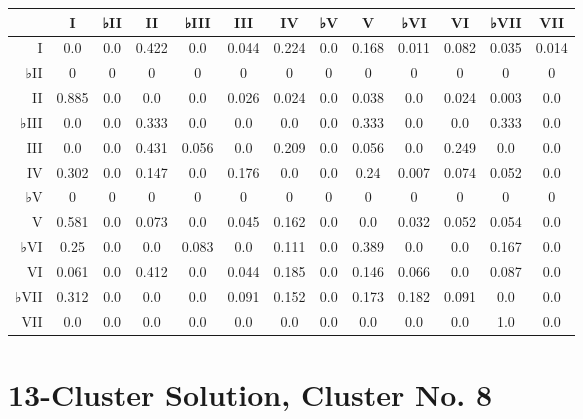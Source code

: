 \begin{table}[htbp]
\begin{minipage}{\linewidth}
\setlength{\tymax}{0.5\linewidth}
\centering
\small
\begin{tabulary}{\textwidth}{@{}RCCCCCCCCCCCC@{}} \toprule
&I&♭II&II&♭III&III&IV&♭V&V&♭VI&VI&♭VII&VII\\
\midrule
I&0.0&0.0&0.422&0.0&0.044&0.224&0.0&0.168&0.011&0.082&0.035&0.014\\
♭II&0&0&0&0&0&0&0&0&0&0&0&0\\
II&0.885&0.0&0.0&0.0&0.026&0.024&0.0&0.038&0.0&0.024&0.003&0.0\\
♭III&0.0&0.0&0.333&0.0&0.0&0.0&0.0&0.333&0.0&0.0&0.333&0.0\\
III&0.0&0.0&0.431&0.056&0.0&0.209&0.0&0.056&0.0&0.249&0.0&0.0\\
IV&0.302&0.0&0.147&0.0&0.176&0.0&0.0&0.24&0.007&0.074&0.052&0.0\\
♭V&0&0&0&0&0&0&0&0&0&0&0&0\\
V&0.581&0.0&0.073&0.0&0.045&0.162&0.0&0.0&0.032&0.052&0.054&0.0\\
♭VI&0.25&0.0&0.0&0.083&0.0&0.111&0.0&0.389&0.0&0.0&0.167&0.0\\
VI&0.061&0.0&0.412&0.0&0.044&0.185&0.0&0.146&0.066&0.0&0.087&0.0\\
♭VII&0.312&0.0&0.0&0.0&0.091&0.152&0.0&0.173&0.182&0.091&0.0&0.0\\
VII&0.0&0.0&0.0&0.0&0.0&0.0&0.0&0.0&0.0&0.0&1.0&0.0\\

\bottomrule

\end{tabulary}
\end{minipage}
\end{table}

\section{13-Cluster Solution, Cluster No. 8}
\label{13-clustersolutionclusterno.8}

